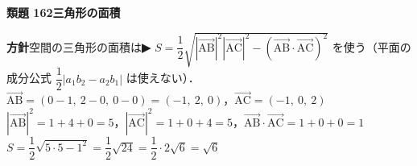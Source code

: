 \documentclass[a4paper,11pt]{ltjsarticle}
\newcommand{\ans}[2]{\Needspace{5\baselineskip}\vspace{6pt}%
  {\sffamily\bfseries 類題 #1\quad #2}\par}
\newcommand{\point}[1]{\textsf{\bfseries ▶ #1}}
\begin{document}
\ans{162}{三角形の面積}
\begin{kai}
\textbf{方針}\quad 空間の三角形の面積は\point{$S=\dfrac12\sqrt{|\overrightarrow{\mathrm{AB}}|^2|\overrightarrow{\mathrm{AC}}|^2-(\overrightarrow{\mathrm{AB}}\cdot\overrightarrow{\mathrm{AC}})^2}$} を使う（平面の成分公式 $\dfrac12|a_1b_2-a_2b_1|$ は使えない）．\\[2pt]
$\overrightarrow{\mathrm{AB}}=(0-1,\ 2-0,\ 0-0)=(-1,\ 2,\ 0)$，\quad $\overrightarrow{\mathrm{AC}}=(-1,\ 0,\ 2)$\\
$|\overrightarrow{\mathrm{AB}}|^2=1+4+0=5$，\quad $|\overrightarrow{\mathrm{AC}}|^2=1+0+4=5$，\quad $\overrightarrow{\mathrm{AB}}\cdot\overrightarrow{\mathrm{AC}}=1+0+0=1$\\[2pt]
$S=\dfrac12\sqrt{5\cdot5-1^2}=\dfrac12\sqrt{24}=\dfrac12\cdot2\sqrt6=\sqrt6$
\end{kai}
\end{document}
